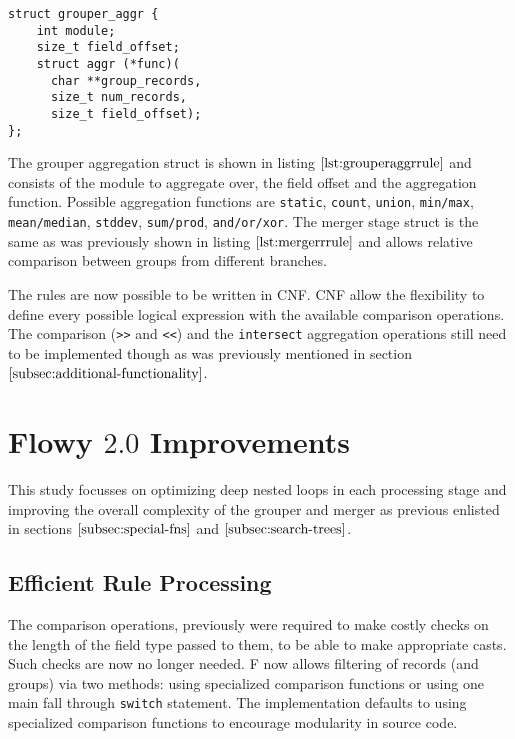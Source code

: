 \begin{lstlisting}
struct grouper_aggr {
	int module;
	size_t field_offset;
	struct aggr (*func)(
	  char **group_records,
	  size_t num_records,
	  size_t field_offset);
};
\end{lstlisting}
The grouper aggregation struct is shown in listing $\ref{lst:grouperaggrrule}$ and consists of the module to aggregate over, the field offset and the aggregation function. Possible aggregation functions are \texttt{static}, \texttt{count}, \texttt{union}, \texttt{min/max}, \texttt{mean/median}, \texttt{stddev}, \texttt{sum/prod}, \texttt{and/or/xor}. The merger stage struct is the same as was previously shown in listing $\ref{lst:mergerrrule}$ and allows relative comparison between groups from different branches. 

The rules are now possible to be written in \ac{CNF}. \ac{CNF} allow the flexibility to define every possible logical expression with the available comparison operations. The comparison (\texttt{>>} and \texttt{<<}) and the \texttt{intersect} aggregation operations still need to be implemented though as was previously mentioned in section $\ref{subsec:additional-functionality}$. 

\section{Flowy $2.0$ Improvements}\label{sec:flowy-2-improvements}
This study focusses on optimizing deep nested loops in each processing stage and improving the overall complexity of the grouper and merger as previous enlisted in sections $\ref{subsec:special-fns}$ and $\ref{subsec:search-trees}$.

\subsection{Efficient Rule Processing}\label{sec:rule-processing}
The comparison operations, previously were required to make costly checks on the length of the field type passed to them, to be able to make appropriate casts. Such checks are now no longer needed. F now allows filtering of records (and groups) via two methods: using specialized comparison functions or using one main fall through \texttt{switch} statement. The implementation defaults to using specialized comparison functions to encourage modularity in source code. 

